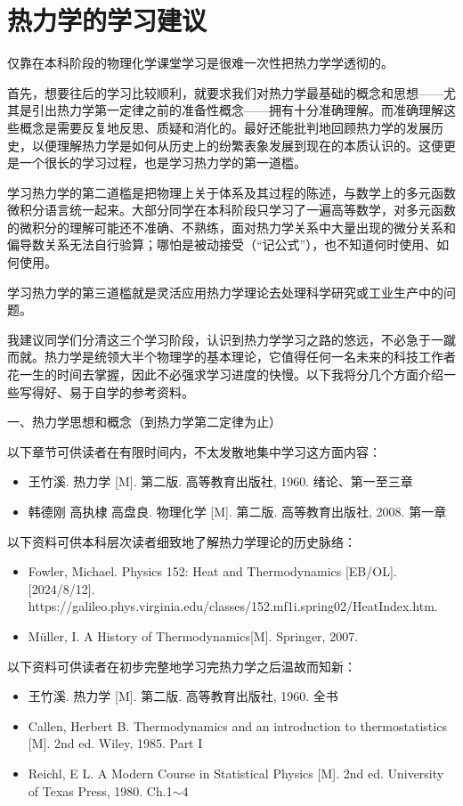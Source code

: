 \documentclass[main.tex]{subfiles}
\begin{document}
\section{热力学的学习建议}\label{I.1 learning_advices}
仅靠在本科阶段的物理化学课堂学习是很难一次性把热力学学透彻的。

首先，想要往后的学习比较顺利，就要求我们对热力学最基础的概念和思想——尤其是引出热力学第一定律之前的准备性概念——拥有十分准确理解。而准确理解这些概念是需要反复地反思、质疑和消化的。最好还能批判地回顾热力学的发展历史，以便理解热力学是如何从历史上的纷繁表象发展到现在的本质认识的。这便更是一个很长的学习过程，也是学习热力学的第一道槛。

学习热力学的第二道槛是把物理上关于体系及其过程的陈述，与数学上的多元函数微积分语言统一起来。大部分同学在本科阶段只学习了一遍高等数学，对多元函数的微积分的理解可能还不准确、不熟练，面对热力学关系中大量出现的微分关系和偏导数关系无法自行验算；哪怕是被动接受（“记公式”），也不知道何时使用、如何使用。

学习热力学的第三道槛就是灵活应用热力学理论去处理科学研究或工业生产中的问题。

我建议同学们分清这三个学习阶段，认识到热力学学习之路的悠远，不必急于一蹴而就。热力学是统领大半个物理学的基本理论，它值得任何一名未来的科技工作者花一生的时间去掌握，因此不必强求学习进度的快慢。以下我将分几个方面介绍一些写得好、易于自学的参考资料。

一、热力学思想和概念（到热力学第二定律为止）

以下章节可供读者在有限时间内，不太发散地集中学习这方面内容：
\begin{itemize}
    \item 王竹溪. 热力学 [M]. 第二版. 高等教育出版社, 1960. 绪论、第一至三章
    \item 韩德刚 高执棣 高盘良. 物理化学 [M]. 第二版. 高等教育出版社, 2008. 第一章
\end{itemize}
以下资料可供本科层次读者细致地了解热力学理论的历史脉络：
\begin{itemize}
    \item Fowler, Michael. Physics 152: Heat and Thermodynamics [EB/OL]. [2024/8/12]. \\https://galileo.phys.virginia.edu/classes/152.mf1i.spring02/HeatIndex.htm.
    \item Müller, I. A History of Thermodynamics[M]. Springer, 2007.
\end{itemize}
以下资料可供读者在初步完整地学习完热力学之后温故而知新：
\begin{itemize}
    \item 王竹溪. 热力学 [M]. 第二版. 高等教育出版社, 1960. 全书
    \item Callen, Herbert B. Thermodynamics and an introduction to thermostatistics [M]. 2nd ed. Wiley, 1985. Part I
    \item Reichl, E L. A Modern Course in Statistical Physics [M]. 2nd ed. University of Texas Press, 1980. Ch.1$\sim$4
\end{itemize}
\end{document}
